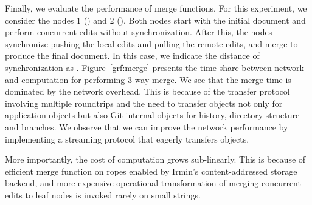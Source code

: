 Finally, we evaluate the performance of merge functions. For this experiment,
we consider the nodes 1 () and 2 (). Both
nodes start with the initial document and perform  concurrent edits
without synchronization. After this, the nodes synchronize pushing the local
edits and pulling the remote edits, and merge to produce the final document. In
this case, we indicate the distance of synchronization as .
Figure~\ref{grf:merge} presents the time share between network and computation
for performing 3-way merge. We see that the merge time is dominated by the
network overhead. This is because of the transfer protocol involving multiple
roundtrips and the need to transfer objects not only for application objects
but also Git internal objects for history, directory structure and branches. We
observe that we can improve the network performance by implementing a streaming
protocol that eagerly transfers objects.

More importantly, the cost of computation grows sub-linearly. This is because
of efficient merge function on ropes enabled by Irmin's content-addressed
storage backend, and more expensive operational transformation of merging
concurrent edits to leaf nodes is invoked rarely on small strings.
